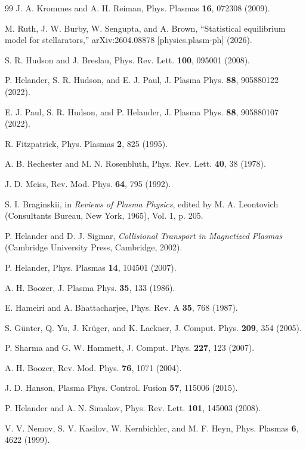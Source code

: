 \documentclass[english]{article}
\begin{document}
\begin{thebibliography}{99}
 J. A. Krommes and A. H. Reiman, Phys. Plasmas {\bf 16}, 072308 (2009).

 M. Ruth, J. W. Burby, W. Sengupta, and A. Brown, ``Statistical equilibrium
model for stellarators,'' arXiv:2604.08878 [physics.plasm-ph] (2026).

 S. R. Hudson and J. Breslau, Phys. Rev. Lett. {\bf 100}, 095001 (2008).

 P. Helander, S. R. Hudson, and E. J. Paul,
J. Plasma Phys. {\bf 88}, 905880122 (2022).

 E. J. Paul, S. R. Hudson, and P. Helander,
J. Plasma Phys. {\bf 88}, 905880107 (2022).

 R. Fitzpatrick, Phys. Plasmas {\bf 2}, 825 (1995).

 A. B. Rechester and M. N. Rosenbluth,
Phys. Rev. Lett. {\bf 40}, 38 (1978).

 J. D. Meiss, Rev. Mod. Phys. {\bf 64}, 795 (1992).

 S. I. Braginskii, in \emph{Reviews of Plasma Physics}, edited by
M. A. Leontovich (Consultants Bureau, New York, 1965), Vol. 1, p. 205.

 P. Helander and D. J. Sigmar, \emph{Collisional Transport in Magnetized
Plasmas} (Cambridge University Press, Cambridge, 2002).

 P. Helander, Phys. Plasmas {\bf 14}, 104501 (2007).

 A. H. Boozer, J. Plasma Phys. {\bf 35}, 133 (1986).

 E. Hameiri and A. Bhattacharjee, Phys. Rev. A {\bf 35}, 768 (1987).

 S. G\"unter, Q. Yu, J. Kr\"uger, and K. Lackner,
J. Comput. Phys. {\bf 209}, 354 (2005).

 P. Sharma and G. W. Hammett, J. Comput. Phys. {\bf 227}, 123 (2007).

 A. H. Boozer, Rev. Mod. Phys. {\bf 76}, 1071 (2004).

 J. D. Hanson, Plasma Phys. Control. Fusion {\bf 57}, 115006 (2015).

 P. Helander and A. N. Simakov,
Phys. Rev. Lett. {\bf 101}, 145003 (2008).

 V. V. Nemov, S. V. Kasilov, W. Kernbichler, and M. F. Heyn,
Phys. Plasmas {\bf 6}, 4622 (1999).


\end{thebibliography}
\end{document}
